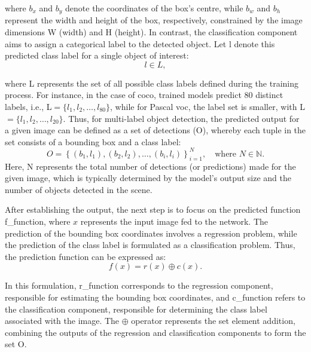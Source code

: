 \noindent where \( b_x \) and \( b_y \) denote the coordinates of the box's centre, while \( b_w \) and \( b_h \) represent the width and height of the box, respectively, constrained by the image dimensions \gls{W} (width) and \gls{H} (height).
In contrast, the classification component aims to assign a categorical label to the detected object. Let \gls{l} denote this predicted class label for a single object of interest:
\begin{equation}
\label{eq:classification_label}
l \in L,
\end{equation}

\noindent where \gls{L} represents the set of all possible class labels defined during the training process. For instance, in the case of \gls{coco}, trained models predict 80 distinct labels, i.e., \gls{L}$ = \{l_1, l_2, \dots, l_{80}\}$, while for Pascal \gls{voc}, the label set is smaller, with \gls{L}$ = \{l_1, l_2, \dots, l_{20}\}$.
Thus, for multi-label object detection, the predicted output for a given image can be defined as a set of detections (\gls{O}), whereby each tuple in the set consists of a bounding box and a class label:
\begin{equation}
\label{eq:multi_label_output}
O = \left\{ (b_1, l_1), (b_2, l_2), \ldots, (b_i, l_i) \right\}_{i=1}^{N}, \quad \text{where } N \in \mathbb{N} .
\end{equation}
Here, \gls{N} represents the total number of detections (or predictions) made for the given image, which is typically determined by the model's output size and the number of objects detected in the scene.

After establishing the output, the next step is to focus on the predicted function \gls{f_function}, where $x$ represents the input image fed to the network. The prediction of the bounding box coordinates involves a regression problem, while the prediction of the class label is formulated as a classification problem. Thus, the prediction function can be expressed as:
\begin{equation}
\label{eq:prediction_function}
f(x) = r(x) \oplus c(x) .
\end{equation}

\noindent In this formulation, \gls{r_function} corresponds to the regression component, responsible for estimating the bounding box coordinates, and \gls{c_function} refers to the classification component, responsible for determining the class label associated with the image. The \(\oplus\) operator represents the set element addition, combining the outputs of the regression and classification components to form the set \gls{O}.

